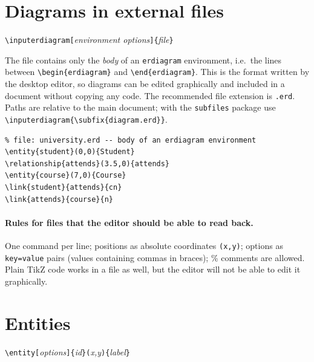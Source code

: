 \documentclass[10pt,a4paper]{article}
\newcommand\meta[1]{\textlangle\textit{#1}\textrangle}
\begin{document}
\section{Diagrams in external files}\label{sec:files}

\begin{center}
\verb|\inputerdiagram[|\meta{environment options}\verb|]{|\meta{file}\verb|}|
\end{center}

The file contains only the \emph{body} of an \texttt{erdiagram}
environment, i.e.\ the lines between \verb|\begin{erdiagram}| and
\verb|\end{erdiagram}|. This is the format written by the desktop
editor, so diagrams can be edited graphically and included in a document
without copying any code. The recommended file extension is
\texttt{.erd}. Paths are relative to the main document; with the
\texttt{subfiles} package use \verb|\inputerdiagram{\subfix{diagram.erd}}|.

\begin{lstlisting}
% file: university.erd -- body of an erdiagram environment
\entity{student}(0,0){Student}
\relationship{attends}(3.5,0){attends}
\entity{course}(7,0){Course}
\link{student}{attends}{cn}
\link{attends}{course}{n}
\end{lstlisting}

\begin{example}
\end{example}

\paragraph{Rules for files that the editor should be able to read
back.} One command per line; positions as absolute coordinates
\verb|(x,y)|; options as \texttt{key=value} pairs (values containing
commas in braces); \% comments are allowed. Plain TikZ code works in a
file as well, but the editor will not be able to edit it graphically.

\section{Entities}

\begin{center}
\verb|\entity[|\meta{options}\verb|]{|\meta{id}\verb|}(|\meta{x,y}\verb|){|\meta{label}\verb|}|
\end{center}
\end{document}
